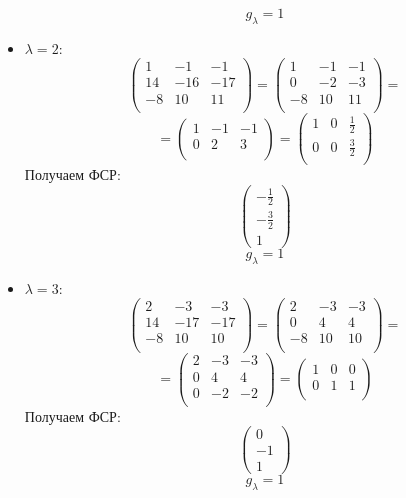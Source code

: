 \documentclass[a4paper,12pt]{article}
\begin{document}
\begin{itemize}
\[
g_{\lambda} = 1
\]
\clearpage
\item $\lambda = 2$:
\[
\begin{pmatrix}
1 & -1 & -1  \\
14 & -16 & -17 \\
-8 & 10 & 11 \\
\end{pmatrix}
=
\begin{pmatrix}
1 & -1 & -1 \\
0 & -2 & -3  \\
-8 & 10 & 11  \\
\end{pmatrix}
=
\]
\[
=
\begin{pmatrix}
1 & -1 & -1  \\
0 & 2 &3 \\
\end{pmatrix}
=
\begin{pmatrix}
1 & 0 & \frac12 \\
0 & 0 & \frac32\\
\end{pmatrix}
\]
Получаем ФСР:
\[
\begin{pmatrix}
-\frac12 \\ -\frac32 \\ 1
\end{pmatrix}
\]
\[
g_{\lambda} = 1
\]
\item $\lambda = 3$:
\[
\begin{pmatrix}
2 & -3 & -3 \\
14 & -17 & -17  \\
-8 & 10 & 10 \\
\end{pmatrix}
=
\begin{pmatrix}
2 & -3 & -3 \\
0 & 4 & 4 \\
-8 & 10 & 10 \\
\end{pmatrix}
=
\]
\[
=
\begin{pmatrix}
2 & -3 & -3 \\
0 & 4 & 4 \\
0 & -2 & -2  \\
\end{pmatrix}
=
\begin{pmatrix}
1 & 0 & 0  \\
0 & 1 & 1  \\
\end{pmatrix}
\]
Получаем ФСР:
\[
\begin{pmatrix}
0 \\ -1 \\ 1
\end{pmatrix}
\]
\[
g_{\lambda} = 1
\]
\end{itemize}
\end{document}
